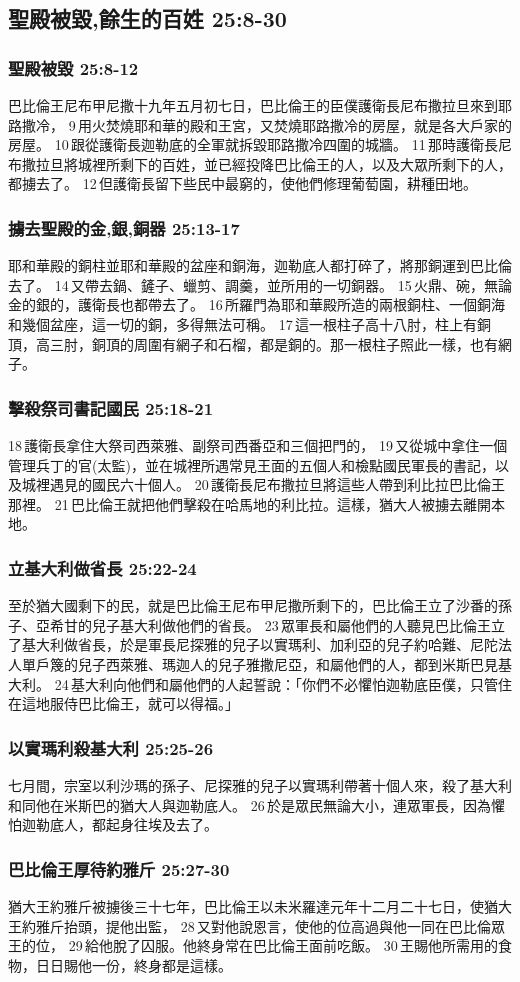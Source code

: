 \subsection{聖殿被毀,餘生的百姓 25:8-30} 
\subsubsection{聖殿被毀 25:8-12} 
巴比倫王尼布甲尼撒十九年五月初七日，巴比倫王的臣僕護衛長尼布撒拉旦來到耶路撒冷， 9 用火焚燒耶和華的殿和王宮，又焚燒耶路撒冷的房屋，就是各大戶家的房屋。 10 跟從護衛長迦勒底的全軍就拆毀耶路撒冷四圍的城牆。 11 那時護衛長尼布撒拉旦將城裡所剩下的百姓，並已經投降巴比倫王的人，以及大眾所剩下的人，都擄去了。 12 但護衛長留下些民中最窮的，使他們修理葡萄園，耕種田地。

\subsubsection{擄去聖殿的金,銀,銅器 25:13-17}
耶和華殿的銅柱並耶和華殿的盆座和銅海，迦勒底人都打碎了，將那銅運到巴比倫去了。 14 又帶去鍋、鏟子、蠟剪、調羹，並所用的一切銅器。 15 火鼎、碗，無論金的銀的，護衛長也都帶去了。 16 所羅門為耶和華殿所造的兩根銅柱、一個銅海和幾個盆座，這一切的銅，多得無法可稱。 17 這一根柱子高十八肘，柱上有銅頂，高三肘，銅頂的周圍有網子和石榴，都是銅的。那一根柱子照此一樣，也有網子。

\subsubsection{擊殺祭司書記國民 25:18-21}
18 護衛長拿住大祭司西萊雅、副祭司西番亞和三個把門的， 19 又從城中拿住一個管理兵丁的官(太監)，並在城裡所遇常見王面的五個人和檢點國民軍長的書記，以及城裡遇見的國民六十個人。 20 護衛長尼布撒拉旦將這些人帶到利比拉巴比倫王那裡。 21 巴比倫王就把他們擊殺在哈馬地的利比拉。這樣，猶大人被擄去離開本地。


\subsubsection{立基大利做省長 25:22-24} 
至於猶大國剩下的民，就是巴比倫王尼布甲尼撒所剩下的，巴比倫王立了沙番的孫子、亞希甘的兒子基大利做他們的省長。 23 眾軍長和屬他們的人聽見巴比倫王立了基大利做省長，於是軍長尼探雅的兒子以實瑪利、加利亞的兒子約哈難、尼陀法人單戶篾的兒子西萊雅、瑪迦人的兒子雅撒尼亞，和屬他們的人，都到米斯巴見基大利。 24 基大利向他們和屬他們的人起誓說：「你們不必懼怕迦勒底臣僕，只管住在這地服侍巴比倫王，就可以得福。」

\subsubsection{以實瑪利殺基大利 25:25-26} 
七月間，宗室以利沙瑪的孫子、尼探雅的兒子以實瑪利帶著十個人來，殺了基大利和同他在米斯巴的猶大人與迦勒底人。 26 於是眾民無論大小，連眾軍長，因為懼怕迦勒底人，都起身往埃及去了。

\subsubsection{巴比倫王厚待約雅斤 25:27-30} 
猶大王約雅斤被擄後三十七年，巴比倫王以未米羅達元年十二月二十七日，使猶大王約雅斤抬頭，提他出監， 28 又對他說恩言，使他的位高過與他一同在巴比倫眾王的位， 29 給他脫了囚服。他終身常在巴比倫王面前吃飯。 30 王賜他所需用的食物，日日賜他一份，終身都是這樣。



